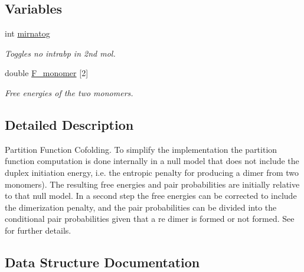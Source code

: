 \subsection*{Variables}
\begin{DoxyCompactItemize}
\item 
\hypertarget{group__pf__cofold_gaff27888c4088cc1f60fd59cbd589474c}{int \hyperlink{group__pf__cofold_gaff27888c4088cc1f60fd59cbd589474c}{mirnatog}}\label{group__pf__cofold_gaff27888c4088cc1f60fd59cbd589474c}

\begin{DoxyCompactList}\small\item\em Toggles no intrabp in 2nd mol. \end{DoxyCompactList}\item 
\hypertarget{group__pf__cofold_gac2d1851a710a8561390861155ca988fe}{double \hyperlink{group__pf__cofold_gac2d1851a710a8561390861155ca988fe}{F\-\_\-monomer} \mbox{[}2\mbox{]}}\label{group__pf__cofold_gac2d1851a710a8561390861155ca988fe}

\begin{DoxyCompactList}\small\item\em Free energies of the two monomers. \end{DoxyCompactList}\end{DoxyCompactItemize}


\subsection{Detailed Description}
Partition Function Cofolding. To simplify the implementation the partition function computation is done internally in a null model that does not include the duplex initiation energy, i.\-e. the entropic penalty for producing a dimer from two monomers). The resulting free energies and pair probabilities are initially relative to that null model. In a second step the free energies can be corrected to include the dimerization penalty, and the pair probabilities can be divided into the conditional pair probabilities given that a re dimer is formed or not formed. See \cite{bernhart:2006} for further details. 

\subsection{Data Structure Documentation}
\label{structvrna__dimer__pf__s}
\hypertarget{group__pf__cofold_structvrna__dimer__pf__s}{}
